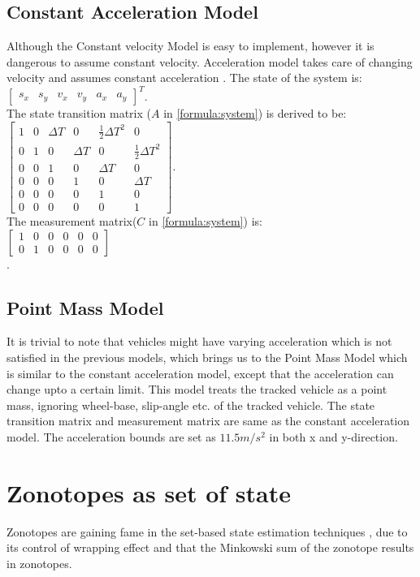 \subsection{Constant Acceleration Model}
Although the Constant velocity Model is easy to implement, however it is dangerous to assume constant velocity. Acceleration model takes care of changing velocity and assumes constant acceleration \cite{Schubert2008}. The state of the system is:\\
$\left[\begin{matrix}
s_x & s_y & v_x & v_y & a_x & a_y
\end{matrix}\right]^{T}$.\\
The state transition matrix ($A$ in \eqref{formula:system}) is derived to be:\\
$\left[\begin{matrix}
1 & 0 & \Delta T & 0 & \frac{1}{2}\Delta T^2 & 0\\
0 & 1 & 0 & \Delta T & 0 & \frac{1}{2}\Delta T^2 \\
0 & 0 & 1 & 0 & \Delta T & 0\\
0 & 0 & 0 & 1 & 0 & \Delta T\\
0 & 0 & 0 & 0 & 1 & 0\\
0 & 0 & 0 & 0 & 0 & 1
\end{matrix}\right]$.\\
The measurement matrix($C$ in \eqref{formula:system}) is:\\
$\left[\begin{matrix}
1 & 0 & 0 & 0 & 0 & 0\\
0 & 1 & 0 & 0 & 0 & 0
\end{matrix}\right]$\\.

\subsection{Point Mass Model}
It is trivial to note that vehicles might have varying acceleration which is not satisfied in the previous models, which brings us to the Point Mass Model\cite{Althoff} which is similar to the constant acceleration model, except that the acceleration can change upto a certain limit. This model treats the tracked vehicle as a point mass, ignoring wheel-base, slip-angle etc. of the tracked vehicle. The state transition matrix and measurement matrix are same as the constant acceleration model. The acceleration bounds are set as $11.5 m/s^2$ in both x and y-direction.

\section{Zonotopes as set of state}
Zonotopes are gaining fame in the set-based state estimation techniques \cite{Le2013}, due to its control of wrapping effect and that the Minkowski sum of the zonotope results in zonotopes. 

